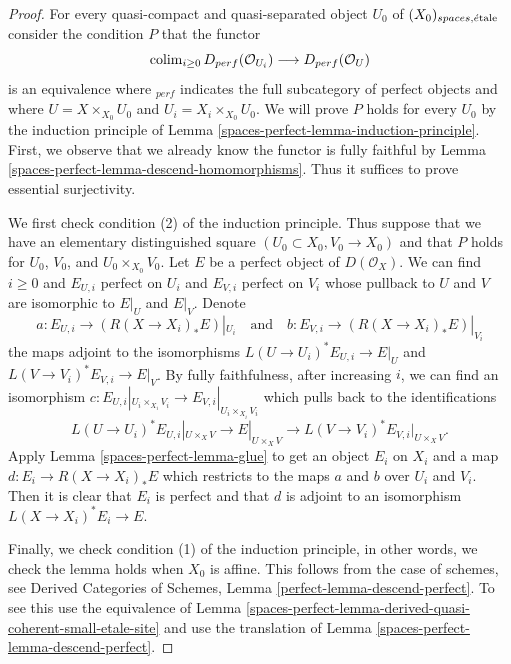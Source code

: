 \begin{proof}
For every quasi-compact and quasi-separated object $U_0$ of
$(X_0)_{spaces, \acute{e}\text{tale}}$ consider the condition $P$ that
the functor
$$
\operatorname{colim}_{i \geq 0} D_{perf}(\mathcal{O}_{U_i})
\longrightarrow
D_{perf}(\mathcal{O}_U)
$$
is an equivalence where ${}_{perf}$ indicates the full subcategory of
perfect objects and where $U = X \times_{X_0} U_0$ and
$U_i = X_i \times_{X_0} U_0$. We will prove $P$ holds for every $U_0$
by the induction principle of Lemma \ref{spaces-perfect-lemma-induction-principle}.
First, we observe that we already know the functor is fully faithful
by Lemma \ref{spaces-perfect-lemma-descend-homomorphisms}. Thus it suffices to prove
essential surjectivity.

\medskip\noindent
We first check condition (2) of the induction principle. Thus suppose
that we have an elementary distinguished square
$(U_0 \subset X_0, V_0 \to X_0)$ and that $P$ holds for
$U_0$, $V_0$, and $U_0 \times_{X_0} V_0$. Let $E$ be a perfect object
of $D(\mathcal{O}_X)$. We can find $i \geq 0$ and $E_{U, i}$ perfect on $U_i$
and $E_{V, i}$ perfect on $V_i$ whose pullback to $U$ and $V$ are isomorphic
to $E|_U$ and $E|_V$. Denote
$$
a : E_{U, i} \to (R(X \to X_i)_*E)|_{U_i}
\quad\text{and}\quad
b : E_{V, i} \to (R(X \to X_i)_*E)|_{V_i}
$$
the maps adjoint to the isomorphisms $L(U \to U_i)^*E_{U, i} \to E|_U$
and $L(V \to V_i)^*E_{V, i} \to E|_V$. By fully faithfulness, after
increasing $i$, we can find an isomorphism
$c : E_{U, i}|_{U_i \times_{X_i} V_i} \to E_{V, i}|_{U_i \times_{X_i} V_i}$
which pulls back to the identifications
$$
L(U \to U_i)^*E_{U, i}|_{U \times_X V} \to E|_{U \times_X V} \to
L(V \to V_i)^*E_{V, i}|_{U \times_X V}.
$$
Apply Lemma \ref{spaces-perfect-lemma-glue}
to get an object $E_i$ on $X_i$ and a map $d : E_i \to R(X \to X_i)_*E$
which restricts to the maps $a$ and $b$ over $U_i$ and $V_i$.
Then it is clear that $E_i$ is perfect and that
$d$ is adjoint to an isomorphism $L(X \to X_i)^*E_i \to E$.

\medskip\noindent
Finally, we check condition (1) of the induction principle, in other
words, we check the lemma holds when $X_0$ is affine.
This follows from the case of schemes, see
Derived Categories of Schemes, Lemma \ref{perfect-lemma-descend-perfect}.
To see this use the equivalence of
Lemma \ref{spaces-perfect-lemma-derived-quasi-coherent-small-etale-site}
and use the translation of Lemma \ref{spaces-perfect-lemma-descend-perfect}.
\end{proof}

